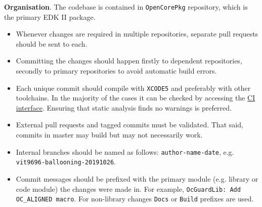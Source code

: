\documentclass[]{article}
\providecommand{\tightlist}{%
  \setlength{\itemsep}{0pt}\setlength{\parskip}{0pt}}
\begin{document}
\textbf{Organisation}. The codebase is contained in \texttt{OpenCorePkg} repository,
which is the primary EDK II package.
\begin{itemize}
\tightlist
\item Whenever changes are required in multiple repositories, separate pull requests should
be sent to each.
\item Committing the changes should happen firstly to dependent repositories, secondly to
primary repositories to avoid automatic build errors.
\item Each unique commit should compile with \texttt{XCODE5} and preferably with other
toolchains. In the majority of the cases it can be checked by accessing the
\href{https://travis-ci.com/acidanthera}{CI interface}. Ensuring that static analysis finds
no warnings is preferred.
\item External pull requests and tagged commits must be validated. That said, commits in
master may build but may not necessarily work.
\item Internal branches should be named as follows: \texttt{author-name-date}, e.g.
\texttt{vit9696-ballooning-20191026}.
\item Commit messages should be prefixed with the primary module (e.g. library or code module) the
changes were made in. For example, \texttt{OcGuardLib: Add OC\_ALIGNED macro}. For non-library changes
\texttt{Docs} or \texttt{Build} prefixes are used.
\end{itemize}
\end{document}
